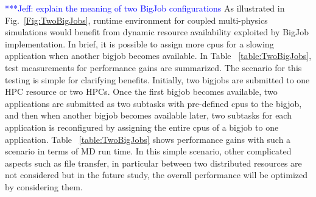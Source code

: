 \documentclass[conference,final]{IEEEtran}
\newcommand{\skonote}[1]{ {\textcolor{blue} { ***Jeff: #1 }}}
\newcommand{\skonote}[1]{}
\begin{document}

\skonote{explain the meaning of two BigJob configurations}
As illustrated in Fig.~\ref{Fig:TwoBigJobs}, runtime environment for coupled multi-physics simulations would benefit from dynamic resource availability exploited by BigJob implementation.  In brief, it is possible to assign more cpus for a slowing application when another bigjob becomes available. In Table ~\ref{table:TwoBigJobs}, test measurements for performance gains are summarized. The scenario for this testing is simple for clarifying benefits.  Initially, two bigjobs are submitted to one HPC resource or two HPCs.  Once the first bigjob becomes available, two applications are submitted as two subtasks with pre-defined cpus to the bigjob, and then when another bigjob becomes available later, two subtasks for each application is reconfigured by assigning the entire cpus of a bigjob to one application.  Table  ~\ref{table:TwoBigJobs} shows performance gains with such a scenario in terms of MD run time.  In this simple scenario, other complicated aspects such as file transfer, in particular between two distributed resources are not considered but in the future study, the overall performance will be optimized by considering them.
\end{document}
